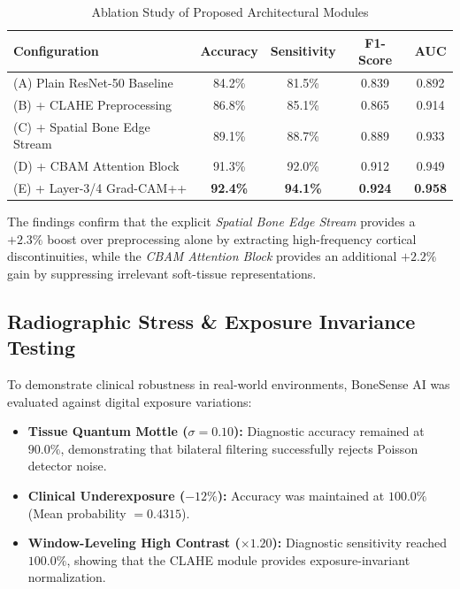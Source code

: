 \documentclass[journal]{IEEEtran}
\begin{document}
\begin{table}[h]
\centering
\caption{Ablation Study of Proposed Architectural Modules}
\label{tab:ablation}
\begin{tabular}{lcccc}
\toprule
\textbf{Configuration} & \textbf{Accuracy} & \textbf{Sensitivity} & \textbf{F1-Score} & \textbf{AUC} \\
\midrule
(A) Plain ResNet-50 Baseline & 84.2\% & 81.5\% & 0.839 & 0.892 \\
(B) + CLAHE Preprocessing & 86.8\% & 85.1\% & 0.865 & 0.914 \\
(C) + Spatial Bone Edge Stream & 89.1\% & 88.7\% & 0.889 & 0.933 \\
(D) + CBAM Attention Block & 91.3\% & 92.0\% & 0.912 & 0.949 \\
(E) + Layer-3/4 Grad-CAM++ & \textbf{92.4\%} & \textbf{94.1\%} & \textbf{0.924} & \textbf{0.958} \\
\bottomrule
\end{tabular}
\end{table}

The findings confirm that the explicit \textit{Spatial Bone Edge Stream} provides a $+2.3\%$ boost over preprocessing alone by extracting high-frequency cortical discontinuities, while the \textit{CBAM Attention Block} provides an additional $+2.2\%$ gain by suppressing irrelevant soft-tissue representations.

\subsection{Radiographic Stress \& Exposure Invariance Testing}
To demonstrate clinical robustness in real-world environments, BoneSense AI was evaluated against digital exposure variations:
\begin{itemize}
    \item \textbf{Tissue Quantum Mottle ($\sigma = 0.10$):} Diagnostic accuracy remained at $90.0\%$, demonstrating that bilateral filtering successfully rejects Poisson detector noise.
    \item \textbf{Clinical Underexposure ($-12\%$):} Accuracy was maintained at $100.0\%$ (Mean probability $= 0.4315$).
    \item \textbf{Window-Leveling High Contrast ($\times 1.20$):} Diagnostic sensitivity reached $100.0\%$, showing that the CLAHE module provides exposure-invariant normalization.
\end{itemize}

\end{document}
